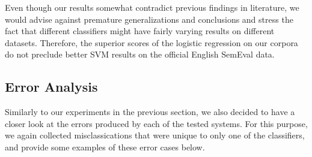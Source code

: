 Even though our results somewhat contradict previous findings in
literature, we would advise against premature generalizations and
conclusions and stress the fact that different classifiers might have
fairly varying results on different datasets.  Therefore, the superior
scores of the logistic regression on our corpora do not preclude
better SVM results on the official English SemEval data.

\subsection{Error Analysis}\label{subsec:cgsa:ml-methods:err-analysis}

Similarly to our experiments in the previous section, we also decided
to have a closer look at the errors produced by each of the tested
systems.  For this purpose, we again collected misclassications that
were unique to only one of the classifiers, and provide some examples
of these error cases below.

